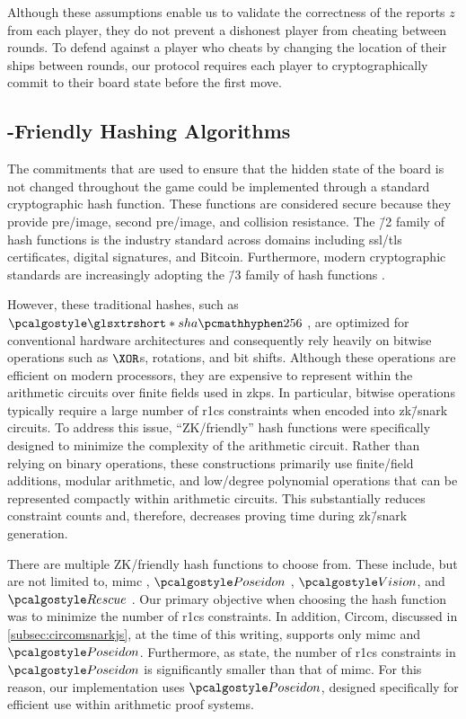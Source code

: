 Although these assumptions enable us to validate the correctness of the reports $z$ from each player, they do not prevent a dishonest player from cheating between rounds. To defend against a player who cheats by changing the location of their ships between rounds, our protocol requires each player to cryptographically commit to their board state before the first move.

\subsection{-Friendly Hashing Algorithms}
\label{subsec:zkFriendly}

The commitments that are used to ensure that the hidden state of the board is not changed throughout the game could be implemented through a standard cryptographic hash function. These functions are considered secure because they provide pre\-/image, second pre\-/image, and collision resistance. The \=/2 \cite{nist15} family of hash functions is the industry standard across domains including \gls{ssl}/\gls{tls} certificates, digital signatures, and Bitcoin. Furthermore, modern cryptographic standards are increasingly adopting the \=/3 family of hash functions \cite{dworkin15}.

However, these traditional hashes, such as $\sha$ \cite{nist15}, are optimized for conventional hardware architectures and consequently rely heavily on bitwise operations such as $\XOR$s, rotations, and bit shifts. Although these operations are efficient on modern processors, they are expensive to represent within the arithmetic circuits over finite fields used in \glspl{zkp}. In particular, bitwise operations typically require a large number of \gls{r1cs} constraints when encoded into \gls{zk}\=/\gls{snark} circuits. To address this issue, \enquote{\gls{ZK}\-/friendly} hash functions were specifically designed to minimize the complexity of the arithmetic circuit. Rather than relying on binary operations, these constructions primarily use finite\-/field additions, modular arithmetic, and low\-/degree polynomial operations that can be represented compactly within arithmetic circuits. This substantially reduces constraint counts and, therefore, decreases proving time during \gls{zk}\=/\gls{snark} generation.

There are multiple \gls{ZK}\-/friendly hash functions to choose from. These include, but are not limited to, \gls{mimc} \cite{albrecht16}, $\poseidon$ \cite{grassi19}, $\vision$, and $\rescue$ \cite{aly19}. Our primary objective when choosing the hash function was to minimize the number of \gls{r1cs} constraints. In addition, Circom, discussed in \cref{subsec:circomsnarkjs}, at the time of this writing, supports only \gls{mimc} and $\poseidon$. Furthermore, as \textcite[\pno~14]{grassi19} state, the number of \gls{r1cs} constraints in $\poseidon$ is significantly smaller than that of \gls{mimc}. For this reason, our implementation uses $\poseidon$, designed specifically for efficient use within arithmetic proof systems.

